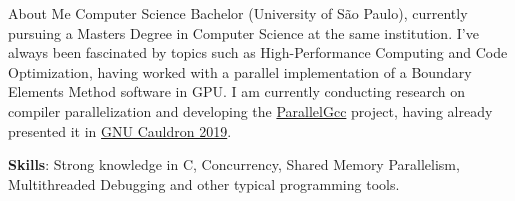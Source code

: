 \begin{section}{About Me}
    Computer Science Bachelor (University of São Paulo),
    currently pursuing a Masters Degree in Computer Science at the same
    institution. I've always been fascinated by topics such as
    High-Performance Computing and Code Optimization, having worked with
    a parallel implementation of a Boundary Elements Method software in GPU.
    I am currently conducting research on compiler parallelization and
    developing the \href{https://gcc.gnu.org/wiki/ParallelGcc}{ParallelGcc} project,
    having already presented it in \href{https://www.youtube.com/watch?v=jd6R3IK\_\_1Q}{GNU Cauldron 2019}.

    \textbf{Skills}: Strong knowledge in C, Concurrency, Shared Memory
    Parallelism, Multithreaded Debugging and other typical programming tools.
\end{section}

